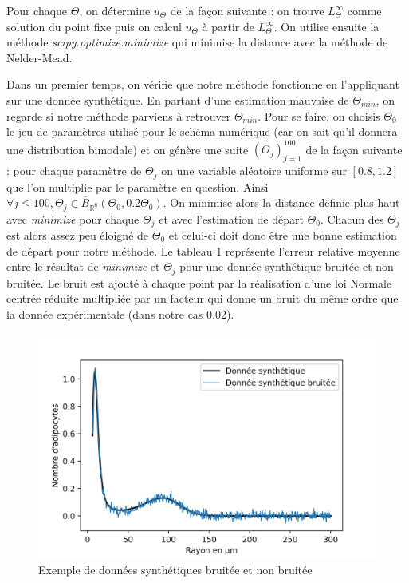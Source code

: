 \documentclass[a4paper,fleqn,leqno]{article}
\begin{document}
Pour chaque $\Theta$, on détermine $u_\Theta$ de la façon suivante : on trouve $L^{\infty}_\Theta$ comme solution du point fixe puis on calcul $u_\Theta$ à partir de $L^{\infty}_\Theta$.
On utilise ensuite la méthode \textit{scipy.optimize.minimize} qui minimise la distance avec la méthode de Nelder-Mead\cite{Nelder}.

Dans un premier temps, on vérifie que notre méthode fonctionne en l'appliquant sur une donnée synthétique. En partant d'une estimation mauvaise de $\Theta_{min}$, on regarde si notre méthode parviens à retrouver $\Theta_{min}$. Pour se faire, on choisis $\Theta_0$ le jeu de paramètres utilisé pour le schéma numérique (car on sait qu'il donnera une distribution bimodale) et on génère une suite $(\Theta_j)_{j=1}^{100}$ de la façon suivante : pour chaque paramètre de $\Theta_j$ on  une variable aléatoire uniforme sur $[0.8,1.2]$ que l'on multiplie par le paramètre en question. Ainsi $\forall j \leq 100, \Theta_j \in \bar{B}_{\mathbb{R}^6}(\Theta_0,0.2\Theta_0)$. On minimise alors la distance définie plus haut avec \textit{minimize} pour chaque $\Theta_j$ et avec l'estimation de départ $\Theta_0$. Chacun des $\Theta_j$ est alors assez peu éloigné de $\Theta_0$ et celui-ci doit donc être une bonne estimation de départ pour notre méthode. 
Le tableau 1 représente l'erreur relative moyenne entre le résultat de \textit{minimize} et $\Theta_j$ pour une donnée synthétique bruitée et non bruitée. Le bruit est ajouté à chaque point par la réalisation d'une loi Normale centrée réduite multipliée par un facteur qui donne un bruit du même ordre que la donnée expérimentale (dans notre cas 0.02).

\begin{figure}[H]
\centering
\includegraphics[scale=0.8]{synth}
\caption{Exemple de données synthétiques bruitée et non bruitée}
\label{figure:2}
\end{figure}
\end{document}
